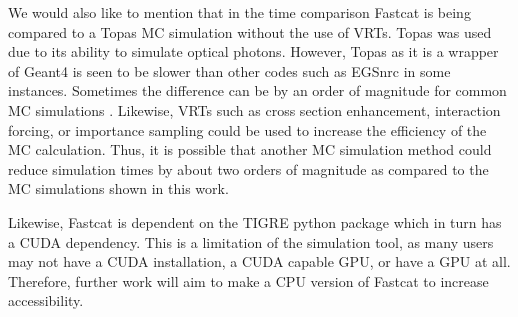 We would also like to mention that in the time comparison Fastcat is being compared to a Topas MC simulation without the use of VRTs. Topas was used due to its ability to simulate optical photons. However, Topas as it is a wrapper of Geant4 is seen to be slower than other codes such as EGSnrc in some instances. Sometimes the difference can be by an order of magnitude for common MC simulations \cite{Archambault2015ComparisonBeams}. Likewise, VRTs such as cross section enhancement, interaction forcing, or importance sampling could be used to increase the efficiency of the MC calculation. Thus, it is possible that another MC simulation method could reduce simulation times by about two orders of magnitude as compared to the MC simulations shown in this work.

Likewise, Fastcat is dependent on the TIGRE python package which in turn has a CUDA dependency. This is a limitation of the simulation tool, as many users may not have a CUDA installation, a CUDA capable GPU, or have a GPU at all. Therefore, further work will aim to make a CPU version of Fastcat to increase accessibility.






